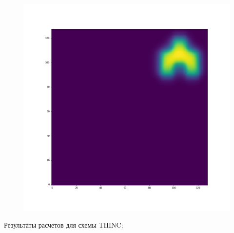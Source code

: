 \documentclass[12pt,a4paper]{article}
\begin{document}
\begin{figure}[H]
\begin{minipage}{.3\textwidth}
\end{minipage}%
\begin{minipage}{.3\textwidth}
  \centering
  \includegraphics[width=\linewidth]{Pictures/Solve2DWhiteBearMovementTestMUSCL/Solve2DWhiteBearMovementTest_t50.png}
\end{minipage}
\end{figure}

Результаты расчетов для схемы THINC:
\end{document}
